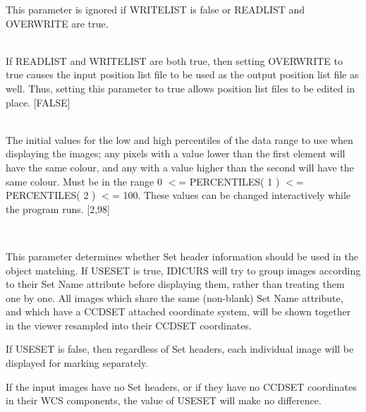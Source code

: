 \documentclass[twoside,11pt]{article}
\renewcommand{\_}{\texttt{\symbol{95}}}
\newcommand{\routine}[1]{{\sc #1}}
\newcommand{\sstsubsection}[1]{ \item[{#1}] \mbox{} \\}
\newcommand{\sstsubsection}[1]{\item[{#1}]}
\begin{document}
{{{         This parameter is ignored if WRITELIST is false or READLIST
         and OVERWRITE are true.
      }
      \sstsubsection{
         OVERWRITE = \_LOGICAL (Read)
      }{
         If READLIST and WRITELIST are both true, then setting OVERWRITE
         to true causes the input position list file to be used as
         the output position list file as well.  Thus, setting this
         parameter to true allows position list files to be edited in
         place.
         [FALSE]
      }
      \sstsubsection{
         PERCENTILES( 2 ) = \_DOUBLE (Read and Write)
      }{
         The initial values for the low and high percentiles of the data
         range to use when displaying the images; any pixels with a value
         lower than the first element will have the same colour, and any
         with a value higher than the second will have the same colour.
         Must be in the range 0 $<$= PERCENTILES( 1 ) $<$= PERCENTILES( 2 )
         $<$= 100.  These values can be changed interactively while the
         program runs.
         [2,98]
      }
      \sstsubsection{
         USESET = \_LOGICAL (Read)
      }{
         This parameter determines whether Set header information
         should be used in the object matching.  If USESET is true,
         \routine{IDICURS} will try to group images according to their Set
         Name attribute before displaying them, rather than treating
         them one by one.  All images which share the same (non-blank)
         Set Name attribute, and which have a CCD\_SET attached
         coordinate system, will be shown together in the viewer
         resampled into their CCD\_SET coordinates.

         If USESET is false, then regardless of Set headers, each
         individual image will be displayed for marking separately.

         If the input images have no Set headers, or if they have no
         CCD\_SET coordinates in their WCS components, the value of
         USESET will make no difference.

}}}
\end{document}
